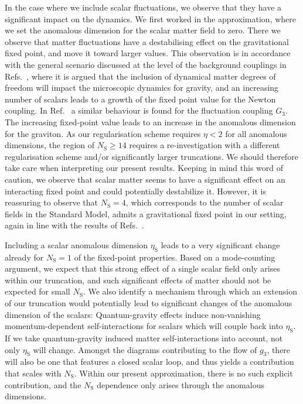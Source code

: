 \documentclass[11pt]{book}
\newcommand\etaS{ \eta_{\scriptscriptstyle{\mathrm{S}}} }
\newcommand\NS{ N_{\scriptscriptstyle{\mathrm{S}}} }
\numberwithin{equation}{chapter}
\begin{document}
In the case where we include scalar fluctuations, we observe that they have a significant impact on the
dynamics.
We first worked in the approximation, where we set the anomalous dimension for the scalar matter field to zero.
There we observe that matter fluctuations have a destabilising effect on the gravitational fixed point,
and move it toward larger values.
This observation is in accordance with the general scenario discussed at the level of the
background couplings in Refs.~\cite{Dona:2013qba, Dona:2014pla},
where it is argued that the inclusion of dynamical matter degrees of freedom will impact
the microscopic dynamics for gravity, and an increasing number of scalars leads to a growth of the
fixed point value for the Newton coupling.
In Ref.~\cite{Meibohm:2015twa} a similar behaviour is found for the fluctuation coupling $G_3$.
The increasing fixed-point value leads to an increase in the anomalous dimension for the graviton.
As our regularisation scheme requires $\eta<2$ for all anomalous dimensions,
the region of $\NS \geq 14$ requires a re-investigation with a different regularisation
scheme and/or significantly larger truncations.
We should therefore take care when interpreting our present results.
Keeping in mind this word of caution, we observe that scalar matter seems to have a significant
effect on an interacting fixed point and could potentially destabilize it.
However, it is reassuring to observe that $\NS=4$, which corresponds to the number of
scalar fields in the Standard Model, admits a gravitational fixed point in our setting,
again in line with the results of Refs.~\cite{Dona:2013qba, Dona:2014pla, Meibohm:2015twa}.

Including a scalar anomalous dimension $\etaS$ leads to a very significant change already for $\NS=1$
of the fixed-point properties.
Based on a mode-counting argument, we expect that this strong effect of a single scalar field
only arises within our truncation,
and such significant effects of matter should not be expected for small $\NS$.
We also identify a mechanism through which an extension of our truncation would potentially
lead to significant changes of the anomalous dimension of the scalars:
Quantum-gravity effects induce non-vanishing momentum-dependent self-interactions
for scalars \cite{Eichhorn:2012va} which will couple back into $\etaS$.
If we take quantum-gravity induced matter self-interactions into account,
not only $\etaS$ will change.
Amongst the diagrams contributing to the flow of $g_3$,
there will also be one that features a closed scalar loop,
and thus yields a contribution that scales with $\NS$.
Within our present approximation, there is no such explicit contribution,
and the $\NS$ dependence only arises through the anomalous dimensions.
\end{document}
